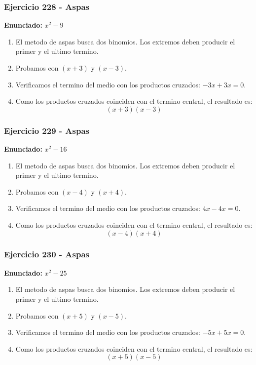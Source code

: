 \documentclass[11pt,a4paper]{article}
\begin{document}
\vspace{0.2cm}
\subsubsection*{Ejercicio 228 - Aspas}
\textbf{Enunciado:} $ x^{2} - 9 $\par
\begin{enumerate}[leftmargin=2em]
\item El metodo de aspas busca dos binomios. Los extremos deben producir el primer y el ultimo termino.
\item Probamos con \((x + 3)\) y \((x - 3)\).
\item Verificamos el termino del medio con los productos cruzados: \(- 3 x+3 x=0\).
\item Como los productos cruzados coinciden con el termino central, el resultado es: \[\boxed{\left(x + 3\right)\left(x - 3\right)}\]
\end{enumerate}

\vspace{0.2cm}
\subsubsection*{Ejercicio 229 - Aspas}
\textbf{Enunciado:} $ x^{2} - 16 $\par
\begin{enumerate}[leftmargin=2em]
\item El metodo de aspas busca dos binomios. Los extremos deben producir el primer y el ultimo termino.
\item Probamos con \((x - 4)\) y \((x + 4)\).
\item Verificamos el termino del medio con los productos cruzados: \(4 x- 4 x=0\).
\item Como los productos cruzados coinciden con el termino central, el resultado es: \[\boxed{\left(x - 4\right)\left(x + 4\right)}\]
\end{enumerate}

\vspace{0.2cm}
\subsubsection*{Ejercicio 230 - Aspas}
\textbf{Enunciado:} $ x^{2} - 25 $\par
\begin{enumerate}[leftmargin=2em]
\item El metodo de aspas busca dos binomios. Los extremos deben producir el primer y el ultimo termino.
\item Probamos con \((x + 5)\) y \((x - 5)\).
\item Verificamos el termino del medio con los productos cruzados: \(- 5 x+5 x=0\).
\item Como los productos cruzados coinciden con el termino central, el resultado es: \[\boxed{\left(x + 5\right)\left(x - 5\right)}\]
\end{enumerate}
\end{document}
